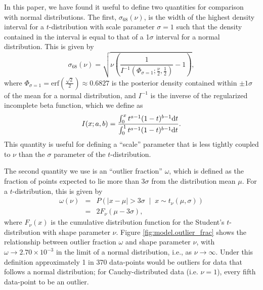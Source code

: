 \documentclass[fleqn,usenatbib]{rasti}
\newcommand{\studentt}[2]{t_\nu \left( #1, #2 \right)}
\begin{document}
In this paper, we have found it useful to define two quantities for comparison
with normal distributions. The first, $\sigma_{68}(\nu)$, is the width of the
highest density interval for a $t$-distribution with scale parameter
$\sigma = 1$ such that the density contained in the interval is equal to that
of a 1$\sigma$ interval for a normal distribution. This is given by
\begin{equation}
    \sigma_{68}(\nu) =
        \sqrt{
            \nu \left(
                \frac{1}{I^{-1}(\Phi_{\sigma=1};\frac\nu2, \frac12)} - 1
            \right)
        },
\end{equation}
where $\Phi_{\sigma=1} = \text{erf}\left(\frac{\sqrt{2}}2\right) \approx 0.6827$
is the posterior density contained within $\pm1\sigma$ of the mean for a normal
distribution, and $I^{-1}$ is the inverse of the regularized incomplete beta function, which we define as
\begin{equation}
    I(x; a, b) = \frac{
        \int_0^x t^{a-1} (1 - t)^{b-1} {\rm d}t
    }{
        \int_0^1 t^{a-1} (1 - t)^{b-1} {\rm d}t
    }.
\end{equation}
This quantity is useful for defining a ``scale'' parameter that is less tightly
coupled to $\nu$ than the $\sigma$ parameter of the $t$-distribution.

The second quantity we use is an ``outlier fraction'' $\omega$, which
is defined as the fraction of points expected to lie more than $3\sigma$ from the
distribution mean $\mu$. For a $t$-distribution, this is given by
\begin{eqnarray}
    \omega(\nu)
    &=& P\left(
        \left|x - \mu \right| > 3 \sigma \;
        \middle| \;
        x \sim \studentt{\mu}{\sigma}
    \right) \label{eqn:model.outlier_frac}\\
    &=& 2 F_\nu \left(\mu - 3 \sigma \right),
\end{eqnarray}
where $F_\nu(x)$ is the cumulative distribution function for the Student's
$t$-distribution with shape parameter $\nu$. Figure \ref{fig:model.outlier_frac}
shows the relationship between outlier fraction $\omega$ and shape parameter
$\nu$, with $\omega \rightarrow 2.70 \times 10^{-3} $ in the limit of a normal
distribution, i.e., as $\nu \rightarrow \infty$.  Under this definition
approximately 1 in 370 data-points would be outliers for data that follows a
normal distribution; for Cauchy-distributed data (i.e. $\nu = 1$), every fifth
data-point to be an outlier.
\end{document}
